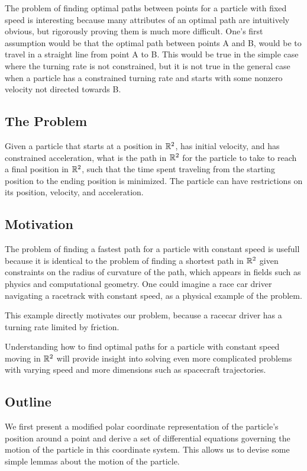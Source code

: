 The problem of finding optimal paths between points for a particle with fixed speed is interesting because many attributes of an optimal path are intuitively obvious, but rigorously proving them is much more difficult. One's first assumption would be that the optimal path between points A and B, would be to travel in a straight line from point A to B. This would be true in the simple case where the turning rate is not constrained, but it is not true in the general case when a particle has a constrained turning rate and starts with some nonzero velocity not directed towards B. 

\subsection{The Problem}

Given a particle that starts at a position in $\mathbb R^2$, has initial velocity, and has constrained acceleration, what is the path in $\mathbb R^2$ for the particle to take to reach a final position in $\mathbb R^2$, such that the time spent traveling from the starting position to the ending position is minimized. The particle can have restrictions on its position, velocity, and acceleration.

\subsection{Motivation}

The problem of finding a fastest path for a particle with constant speed is usefull because it is identical to the problem of finding a shortest path in $\mathbb R^2$ given constraints on the radius of curvature of the path, which appears in fields such as physics and computational geometry. One could imagine a race car driver navigating a racetrack with constant speed, as a physical example of the problem.

This example directly motivates our problem, because a racecar driver has a turning rate limited by friction.

Understanding how to find optimal paths for a particle with constant speed moving in $\mathbb R^2$ will provide insight into solving even more complicated problems with varying speed and more dimensions such as spacecraft trajectories.

 

\subsection{Outline}

We first present a modified polar coordinate representation of the particle's position around a point and derive a set of differential equations governing the motion of the particle in this coordinate system. This allows us to devise some simple lemmas about the motion of the particle.
